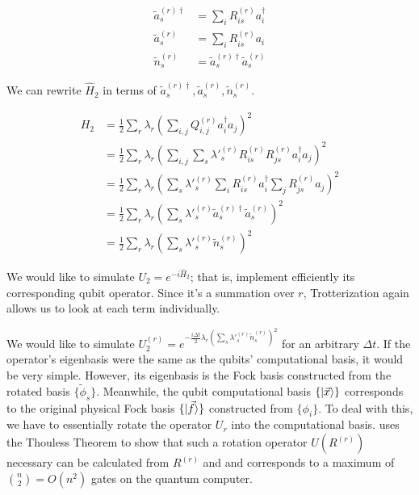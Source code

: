 \begin{equation}
    \begin{split}
        \tilde{a}^{(r)\dag}_s &= \sum_iR^{(r)}_{is}a^\dag_i \\
        \tilde{a}^{(r)}_s &= \sum_iR^{(r)}_{is}a_i \\
        \tilde{n}^{(r)}_s &= \tilde{a}^{(r)\dag}_s\tilde{a}^{(r)}_s
    \end{split}
\end{equation}

We can rewrite $\hat{H}_2$ in terms of $\tilde{a}^{(r)\dag}_s, \tilde{a}^{(r)}_s, \tilde{n}^{(r)}_s$.

\begin{equation}
    \begin{split}
        H_2 &= \frac{1}{2}\sum_r\lambda_r\left(\sum_{i,j} Q^{(r)}_{i, j}a^\dag_ia_j\right)^2 \\
        &= \frac{1}{2}\sum_r\lambda_r\left(\sum_{i,j} \sum_s \lambda'^{(r)}_s R^{(r)}_{is}R^{(r)}_{js}a^\dag_ia_j\right)^2 \\
        &= \frac{1}{2}\sum_r\lambda_r\left(\sum_s \lambda'^{(r)}_s \sum_i R^{(r)}_{is}a^\dag_i\sum_jR^{(r)}_{js}a_j\right)^2 \\
        &= \frac{1}{2}\sum_r\lambda_r\left(\sum_s \lambda'^{(r)}_s \tilde{a}^{(r)\dag}_s\tilde{a}^{(r)}_s\right)^2 \\
        &= \frac{1}{2}\sum_r\lambda_r\left(\sum_s \lambda'^{(r)}_s \tilde{n}^{(r)}_s\right)^2
    \end{split}
\end{equation}

We would like to simulate $U_2 = e^{-i\hat{H}_2}$; that is, implement efficiently its corresponding qubit operator. Since it's a summation over $r$, Trotterization again allows us to look at each term individually.

We would like to simulate $U_2^{(r)} = e^{-\frac{i\Delta t}{2}\lambda_r\left(\sum_s \lambda'^{(r)}_s \tilde{n}^{(r)}_s\right)^2}$ for an arbitrary $\Delta t$. If the operator's eigenbasis were the same as the qubits' computational basis, it would be very simple. However, its eigenbasis is the Fock basis constructed from the rotated basis $\{\tilde{\phi}_s\}$. Meanwhile, the qubit computational basis $\{\ket{\vec{x}}\}$ corresponds to the original physical Fock basis $\{\ket{\vec{f}}\}$ constructed from $\{\phi_i\}$. To deal with this, we have to essentially rotate the operator $U_r$ into the computational basis. \cite{FSN} uses the Thouless Theorem to show that such a rotation operator $U(R^{(r)})$ necessary can be calculated from $R^{(r)}$ and and corresponds to a maximum of ${n \choose 2} = O(n^2)$ gates on the quantum computer. 

